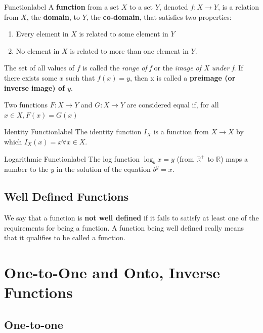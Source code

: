 \documentclass[a4paper]{report}
\begin{document}
\begin{definition}{Function}{label}
    A \textbf{function} from a set $X$ to a set $Y$, denoted $f: X \to Y$, is a relation from
    $X$, the \textbf{domain}, to $Y$, the \textbf{co-domain}, that satisfies two properties:
    \begin{enumerate}
        \item Every element in $X$ is related to some element in $Y$
        \item No element in $X$ is related to more than one element in $Y$.
    \end{enumerate}
    The set of all values of $f$ is called the \emph{range of f} or the \emph{image of X under f}.
    If there exists some $x$ such that $f(x)=y$, then x is called a \textbf{preimage 
    (or inverse image) of $y$}.

    Two functions $F: X \to Y$ and $G: X \to Y$ are considered equal if, for all $x \in X, F(x) = G(x)$
\end{definition}

\begin{definition}{Identity Function}{label}
    The identity function $I_X$ is a function from $X \to X$ by which $I_X(x) = x \forall x \in X$.
\end{definition}

\begin{definition}{Logarithmic Function}{label}
    The log function $\log_b{x}=y$ (from $\mathbb{R}^{+}$ to $\mathbb{R}$) maps a number to the $y$ in the solution of
    the equation $b^y=x$.
\end{definition}

\subsection{Well Defined Functions}

We say that a function is \textbf{not well defined} if it fails to satisfy at least one of the
requirements for being a function. A function being well defined really means that it qualifies
to be called a function.

\section{One-to-One and Onto, Inverse Functions}

\subsection{One-to-one}
\end{document}
